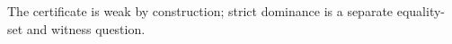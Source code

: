 The certificate is weak by construction; strict dominance is a separate equality-set and witness question.